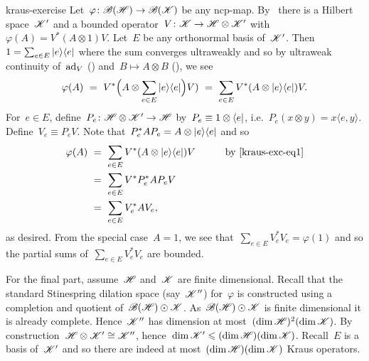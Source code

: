 \documentclass[b5page]{book}
\begin{document}
\begin{solution}{kraus-exercise}%
Let~$\varphi\colon \mathscr{B}(\mathscr{H}) \to \mathscr{B}(\mathscr{K})$
    be any ncp-map.
By~
    there is a Hilbert space~$\mathscr{K}'$
    and a bounded operator~$V\colon \mathscr{K} \to \mathscr{H} \otimes \mathscr{K}'$
    with~$\varphi(A) = V^* (A \otimes 1) V$.
Let~$E$ be any orthonormal basis of~$\mathscr{K}'$.
    Then~$1 = \sum_{e\in E} \left|e\right>\!\left<e\right|$
        where the sum converges ultraweakly
        and so by ultraweak continuity of~$\mathrm{ad}_V$ ()
        and~$B \mapsto A\otimes B$ (), we see
    \begin{equation}\label{kraus-exc-eq1}
        \varphi(A) \ =\  V^* \Bigl(A \otimes \sum_{e\in E} \left|e\right>\!\left<e\right|\Bigr) V
        ) \ =\  \sum_{e \in E} V^* (A \otimes \left|e\right>\!\left<e\right|) V.
    \end{equation}
For~$e\in E$, define~$P_e \colon \mathscr{H} \otimes \mathscr{K}' \to \mathscr{H}$
    by~$P_e \equiv 1\otimes \bra{e}$,
    i.e.~$P_e(x \otimes y) = x \langle e, y\rangle$.
Define~$V_e \equiv P_e V$.
    Note that~$P_e^*AP_e = A \otimes\left|e\right>\!\left<e\right|$ and so
\begin{alignat*}{2}
    \varphi(A)
    &\ = \  \sum_{e \in E} V^* (A \otimes \left|e\right>\!\left<e\right| ) V &\qquad&
    \text{by \eqref{kraus-exc-eq1}} \\
    &\ = \  \sum_{e \in E} V^* P_e^*A P_e V \\
    &\ = \  \sum_{e \in E} V_e^* A V_e,
\end{alignat*}
as desired.
From the special case~$A=1$, we see
    that~$\sum_{e \in E} V_e^*V_e = \varphi(1)$
    and so the partial sums of~$\sum_{e \in E} V_e^* V_e$ are bounded.

For the final part, assume~$\mathscr{H}$ and~$\mathscr{K}$ are finite dimensional.
Recall that the standard Stinespring dilation space (say~$\mathscr{K}''$)
    for~$\varphi$ is constructed using a completion
    and quotient of~$\mathscr{B}(\mathscr{H})\odot \mathscr{K}$.
As~$\mathscr{B}(\mathscr{H})\odot \mathscr{K}$ is finite dimensional
    it is already complete.
    Hence~$\mathscr{K}''$ has dimension at most~$(\dim\mathscr{H})^2( \dim\mathscr{K})$.
By construction~$\mathscr{H} \otimes \mathscr{K}' \cong \mathscr{K}''$,
    hence~$\dim \mathscr{K}' \leqslant (\dim \mathscr{H} )(\dim \mathscr{K})$.
Recall~$E$ is a basis of~$\mathscr{K}'$
    and so there are indeed at most~$(\dim \mathscr{H} )(\dim \mathscr{K})$
        Kraus operators.
\end{solution}
\end{document}
